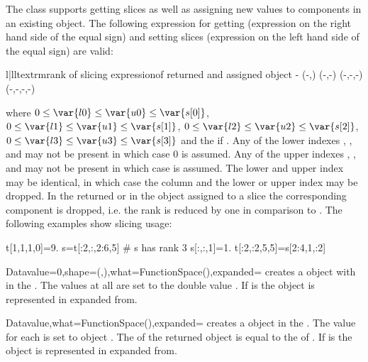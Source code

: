 The \Data class supports getting slices as well as assigning new values to components in an existing
\Data object. 
The following expression for getting (expression on the right hand side of the
equal sign) and setting slices (expression on the left hand side of the
equal sign) are valid:
\begin{tableiii}{l|ll}{textrm}{rank of }{slicing expression}{\Shape of returned and assigned object}
                      {-}
                   {(-,)}
             {(-,-)}
      {(-,-,-)}
 {(-,-,-,-)}
\end{tableiii}
where 
$0 \le \var{l0} \le \var{u0} \le \var{s[0]}$,
$0 \le \var{l1} \le \var{u1} \le \var{s[1]}$, 
$0 \le \var{l2} \le \var{u2} \le \var{s[2]}$, 
$0 \le \var{l3} \le \var{u3} \le \var{s[3]}$ and  the \Shape if . 
Any of the lower indexes , ,  and  may not be present in which case 
$0$ is assumed. 
Any of the upper indexes , ,  and  may not be present in which case 
 is assumed. The lower and upper index may be identical, in which case the column and the lower or upper
index may be dropped. In the returned or in the object assigned to a slice the corresponding component is dropped,
i.e. the rank is reduced by one in comparison to .
The following examples show slicing usage:  
\begin{python}
t[1,1,1,0]=9.
s=t[:2,:,2:6,5] # s has rank 3
s[:,:,1]=1.
t[:2,:2,5,5]=s[2:4,1,:2]
\end{python}



\begin{classdesc}{Data}{value=0,shape=(,),what=FunctionSpace(),expanded=\False}
creates a \Data object with \Shape {} in the \FunctionSpace {}.
The values at all \DataSamplePoints are set to the double value . If  is \True
the \Data object is represented in expanded from.
\end{classdesc}

\begin{classdesc}{Data}{value,what=FunctionSpace(),expanded=\False}
creates a \Data object in the \FunctionSpace {}. 
The value for each \DataSamplePoints is set to \numarray object . 
The \Shape of the returned object is equal to the \Shape of . If  is \True
the \Data object is represented in expanded from.
\end{classdesc}

